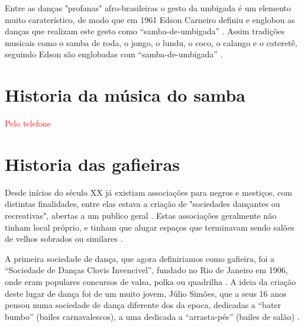 Entre as danças "profanas" \cite[pp. 85]{sandroni2001feitico} afro-brasileiras o gesto da umbigada é um elemento muito caraterístico,
de modo que em 1961 Edson Carneiro definiu e englobou as danças que realizam este 
gesto como ``samba-de-umbigada'' . Assim tradições 
musicais como o samba de roda, o jongo, o lundu, o coco, o calango e o cateretê, 
seguindo Edson são englobadas com  ``samba-de-umbigada'' \cite[pp. 85]{sandroni2001feitico}.

\section{Historia da música do samba}

\textcolor{red}{Pelo telefone}

\section{Historia das gafieiras}




Desde inícios do século XX já existiam associações para negros e mestiços, 
com distintas  finalidades, entre elas estava a criação de 
"sociedades dançantes ou recreativas", abertas a um publico geral
\cite[pp. 154-155]{neres1999negro} \cite[pp. 71]{de2008bexiga} \cite[pp. 11]{respeitojournalbrasil1}.
Estas associações geralmente não tinham local próprio, 
e tinham que alugar espaços que terminavam sendo salões de velhos sobrados
ou similares \cite[pp. 154-155]{neres1999negro} \cite[pp. 49]{diniz2003almanaque}.

A primeira sociedade de dança, que agora definiriamos como gafieira, 
foi a ``Sociedade de Danças Clovis Invencivel'', 
fundado no Rio de Janeiro em 1906, 
onde eram populares concursos de valsa, polka ou quadrilha \cite[pp. 3]{entrevistajuliojournalbrasil1}.
A ideia da criação deste lugar de dança foi de um muito jovem, Júlio Simões,
que a seus 16 anos pensou numa sociedade de dança diferente dos da epoca,
dedicadas a ``bater bumbo'' (bailes carnavalescos), 
a uma dedicada a ``arrasta-pés'' (bailes de salão) \cite[pp. 3]{entrevistajuliojournalbrasil1}.

